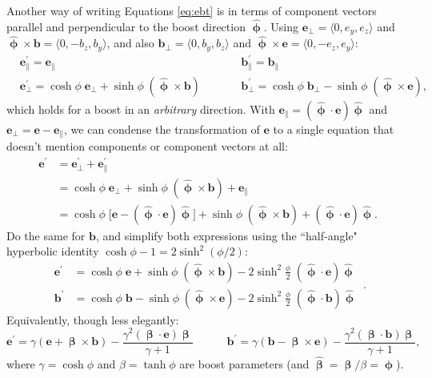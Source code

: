 \documentclass[12pt]{article}
\renewcommand{\vv}[1]{\mathbf{#1}}
\newcommand{\vvbeta}{\bm{\upbeta}}
\newcommand{\hatbeta}{\bm{\hat{\upbeta}}}
\newcommand{\hatphi}{\bm{\hat{\upphi}}}
\begin{document}
Another way of writing Equations \ref{eq:ebt} is in terms of component vectors parallel and perpendicular to the boost direction $\hatphi$. Using $\vv e_\perp = \langle 0, e_y, e_z \rangle$ and $\hatphi \times \vv b = \langle 0, -b_z, b_y \rangle$, and also $\vv b_\perp = \langle 0, b_y, b_z \rangle$ and $\hatphi \times \vv e = \langle 0, -e_z, e_y \rangle$:
\begin{equation*}
\begin{aligned}
& \vv e^\prime_\parallel = \vv e_\parallel  \qquad \qquad& & \vv b^\prime_\parallel = \vv b_\parallel  \\
& \vv e^\prime_\perp =  \cosh{\phi} \; \vv e_\perp  +  \sinh{\phi} \; ( \hatphi \times \vv b )   \qquad& & \vv b^\prime_\perp = \cosh{\phi} \; \vv b_\perp  - \sinh{\phi} \; ( \hatphi \times \vv e ) ,
\end{aligned}
\end{equation*}
which holds for a boost in an \emph{arbitrary} direction. With $\vv e_\parallel = (\hatphi \cdot \vv e) \hatphi$ and $\vv e_\perp = \vv e - \vv e_\parallel$, we can condense the transformation of $\vv e$ to a single equation that doesn't mention components or component vectors at all:
\begin{equation*}
\begin{split}
\vv e^\prime &= \vv e^\prime_\perp  + \vv e^\prime_\parallel \\
&= \cosh{\phi} \; \vv e_\perp  +  \sinh{\phi} \; ( \hatphi \times \vv b ) + \vv e_\parallel \\
&= \cosh{\phi} \; \big[ \vv e - (\hatphi \cdot \vv e) \hatphi \big] + \sinh{\phi} \; (\hatphi \times \vv b) + (\hatphi \cdot \vv e) \hatphi .
\end{split}
\end{equation*}
Do the same for $\vv b$, and simplify both expressions using the ``half-angle" hyperbolic identity $\cosh{\phi} - 1 = 2 \sinh^2{(\phi/2)}$:
\begin{equation}\label{eq:ebr}
\boxed{
\begin{aligned}
\vv e^\prime &= \cosh{\phi} \; \vv e + \sinh{\phi} \; (\hatphi \times \vv b) - 2 \sinh^2 \frac{\phi}{2} \; (\hatphi \cdot \vv e) \hatphi \\[4pt]
\vv b^\prime &= \cosh{\phi} \; \vv b - \sinh{\phi} \; (\hatphi \times \vv e) - 2 \sinh^2 \frac{\phi}{2} \; (\hatphi \cdot \vv b) \hatphi 
\end{aligned}
} \, .
\end{equation}
Equivalently, though less elegantly:
\begin{equation*}
\vv e^\prime = \gamma \left( \vv e + \vvbeta \times \vv b \right) - \dfrac{\gamma^2 (\vvbeta \cdot \vv e) \vvbeta}{\gamma + 1} \qquad \quad \vv b^\prime = \gamma \left( \vv b - \vvbeta \times \vv e \right) - \dfrac{\gamma^2 (\vvbeta \cdot \vv b) \vvbeta}{\gamma + 1},
\end{equation*}
where $\gamma = \cosh{\phi}$ and $\beta = \tanh{\phi}$ are boost parameters (and $\hatbeta = \vvbeta / \beta = \hatphi$).
\end{document}
